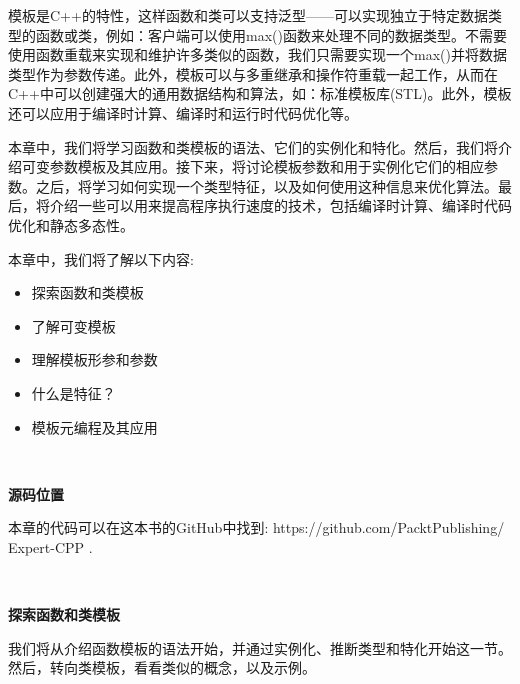 模板是C++的特性，这样函数和类可以支持泛型——可以实现独立于特定数据类型的函数或类，例如：客户端可以使用max()函数来处理不同的数据类型。不需要使用函数重载来实现和维护许多类似的函数，我们只需要实现一个max()并将数据类型作为参数传递。此外，模板可以与多重继承和操作符重载一起工作，从而在C++中可以创建强大的通用数据结构和算法，如：标准模板库(STL)。此外，模板还可以应用于编译时计算、编译时和运行时代码优化等。 \par
本章中，我们将学习函数和类模板的语法、它们的实例化和特化。然后，我们将介绍可变参数模板及其应用。接下来，将讨论模板参数和用于实例化它们的相应参数。之后，将学习如何实现一个类型特征，以及如何使用这种信息来优化算法。最后，将介绍一些可以用来提高程序执行速度的技术，包括编译时计算、编译时代码优化和静态多态性。\par
本章中，我们将了解以下内容: \par

\begin{itemize}
	\item 探索函数和类模板
	\item 了解可变模板
	\item 理解模板形参和参数
	\item 什么是特征？
	\item 模板元编程及其应用
\end{itemize}

\noindent\textbf{}\ \par
\textbf{源码位置} \ \par
本章的代码可以在这本书的GitHub中找到: https:/​/​github.com/​PacktPublishing/​Expert-​CPP . \par

\noindent\textbf{}\ \par
\textbf{探索函数和类模板} \ \par
我们将从介绍函数模板的语法开始，并通过实例化、推断类型和特化开始这一节。然后，转向类模板，看看类似的概念，以及示例。\par

